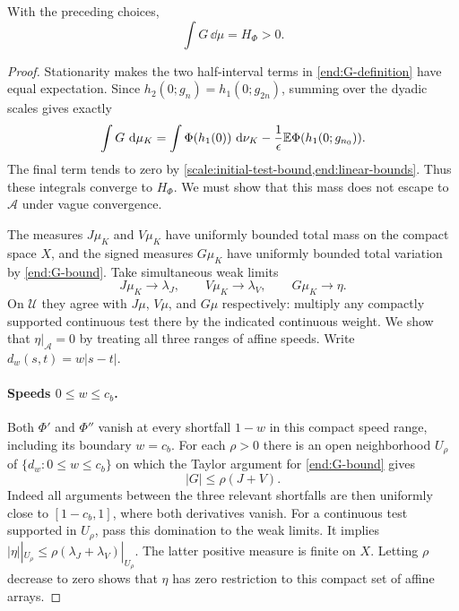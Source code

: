\begin{proposition}\label{end:balance}
With the preceding choices,
\begin{equation}\label{end:balance-equation}
 \int G\,\dd\mu=H_\Phi>0.
\end{equation}
\end{proposition}

\begin{proof}
Stationarity makes the two half-interval terms in
\cref{end:G-definition} have equal expectation.  Since
$h_2(0;g_n)=h_1(0;g_{2n})$, summing over the dyadic scales gives exactly
\[
 \int G\,\,\mathrm{d}\mu_K
 =\int\Phi(h_1(0))\,\,\mathrm{d}\nu_K
  -\frac1\epsilon\mathbb{E}\Phi(h_1(0;g_{n_0})).
\]
The final term tends to zero by
\cref{scale:initial-test-bound,end:linear-bounds}.  Thus these integrals
converge to $H_\Phi$.  We must show that this mass does not escape to
$\mathcal A$ under vague convergence.

The measures $J\mu_K$ and $V\mu_K$ have uniformly bounded total mass on
the compact space $X$, and the signed measures $G\mu_K$ have uniformly
bounded total variation by \cref{end:G-bound}.  Take simultaneous weak
limits
\[
 J\mu_K\longrightarrow\lambda_J,\qquad
 V\mu_K\longrightarrow\lambda_V,\qquad
 G\mu_K\longrightarrow\eta.
\]
On $\mathcal U$ they agree with $J\mu$, $V\mu$, and $G\mu$ respectively:
multiply any compactly supported continuous test there by the indicated
continuous weight.  We show that $\eta|_{\mathcal A}=0$ by treating all
three ranges of affine speeds.  Write $d_w(s,t)=w|s-t|$.

\paragraph{Speeds $0\le w\le c_b$.}
Both $\Phi'$ and $\Phi''$ vanish at every shortfall $1-w$ in this compact
speed range, including its boundary $w=c_b$.  For each $\rho>0$ there is
an open neighborhood $U_\rho$ of
$\{d_w:0\le w\le c_b\}$ on which the Taylor argument for
\cref{end:G-bound} gives
\[
 |G|\le\rho(J+V).
\]
Indeed all arguments between the three relevant shortfalls are then
uniformly close to $[1-c_b,1]$, where both derivatives vanish.
For a continuous test supported in $U_\rho$, pass this domination to
the weak limits.  It implies
$|\eta||_{U_\rho}\le\rho(\lambda_J+\lambda_V)|_{U_\rho}$.
The latter positive measure is finite on $X$.  Letting $\rho$ decrease
to zero shows that $\eta$ has zero restriction to this compact set of
affine arrays.


\end{proof}
